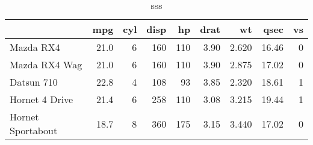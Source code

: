 \documentclass[]{article}
\begin{document}
\begingroup\fontsize{6}{8}\selectfont
{}

\begin{longtable}[l]{l|r|r|r|r|r|r|r|r}
\caption{\label{tab:unnamed-chunk-8}sss}\\
\hline
  & mpg & cyl & disp & hp & drat & wt & qsec & vs\\
\hline
Mazda RX4 & 21.0 & 6 & 160 & 110 & 3.90 & 2.620 & 16.46 & 0\\
\hline
Mazda RX4 Wag & 21.0 & 6 & 160 & 110 & 3.90 & 2.875 & 17.02 & 0\\
\hline
Datsun 710 & 22.8 & 4 & 108 & 93 & 3.85 & 2.320 & 18.61 & 1\\
\hline
Hornet 4 Drive & 21.4 & 6 & 258 & 110 & 3.08 & 3.215 & 19.44 & 1\\
\hline
Hornet Sportabout & 18.7 & 8 & 360 & 175 & 3.15 & 3.440 & 17.02 & 0\\
\hline
\end{longtable}

\endgroup
\end{document}
